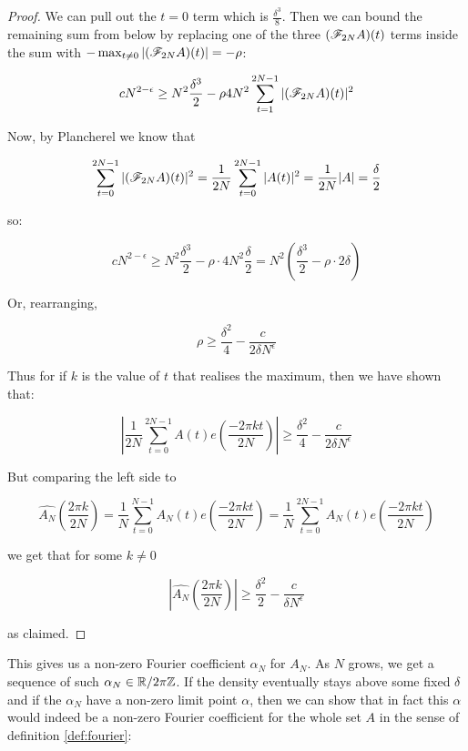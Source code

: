 \documentclass{report}
\newtheorem{corollary}{Corollary}[theorem]
\theoremstyle{remark}
\numberwithin{equation}{section}
\begin{document}
\begin{proof}
  We can pull out the $t = 0$ term which is $\frac{\delta^3}{8}$.  Then we can
  bound the remaining sum from below by replacing one of the three
  $(\mathscr{F}_{2N} A)(t)$ terms inside the sum with
  $-\max_{t\neq 0} |(\mathscr{F}_{2N} A)(t)| = -\rho$:
  
  \[cN^{2-\epsilon} \geq N^2 \frac{\delta^3}{2} - \rho 4 N^2 \sum_{t=1}^{2N-1} |(\mathscr{F}_{2N} A)(t)|^2\]

  Now, by Plancherel we know that

  \[\sum_{t=0}^{2N-1} |(\mathscr{F}_{2N}A)(t)|^2 = \frac{1}{2N}
  \sum_{t=0}^{2N-1} |A(t)|^2 = \frac{1}{2N} |A| = \frac{\delta}{2}\]

  so:

  \[cN^{2-\epsilon} \geq N^2 \frac{\delta^3}{2} - \rho \cdot 4N^2
    \frac{\delta}{2} = N^2\left(\frac{\delta^3}{2} - \rho\cdot 2
      \delta \right)\]

  Or, rearranging, 

  \[\rho \geq \frac{\delta^2}{4} - \frac{c}{2\delta N^\epsilon}\]

  Thus for if $k$ is the value of $t$ that realises the maximum, then we
  have shown that: 
  
  \[\left|\frac{1}{2N} \sum_{t=0}^{2N-1} A(t) e(\frac{-2\pi k
        t}{2N})\right| \geq \frac{\delta^2}{4} - \frac{c}{2\delta N^\epsilon}\]
  
  But comparing the left side to 
  
  \[\widehat{A_N}(\frac{2\pi k}{2N}) = \frac{1}{N}\sum_{t=0}^{N-1} A_N(t) e(\frac{-2\pi k
      t}{2N}) = \frac{1}{N}\sum_{t=0}^{2N-1} A_N(t) e(\frac{-2\pi k
      t}{2N})\]
  
  we get that for some $k \neq 0$

  \[|\widehat{A_N}(\frac{2\pi k}{2N})| \geq \frac{\delta^2}{2} - \frac{c}{\delta
      N^\epsilon}\]

  as claimed.
\end{proof}

This gives us a non-zero Fourier coefficient $\alpha_N$ for $A_N$.  As
$N$ grows, we get a sequence of such $\alpha_N \in \mathbb{R}/2\pi\mathbb{Z}$.  If the
density eventually stays above some fixed $\delta$ and if the
$\alpha_N$ have a non-zero limit point $\alpha$, then we can show that
in fact this $\alpha$ would indeed be a non-zero Fourier coefficient
for the whole set $A$ in the sense of definition \ref{def:fourier}: 

\end{document}
